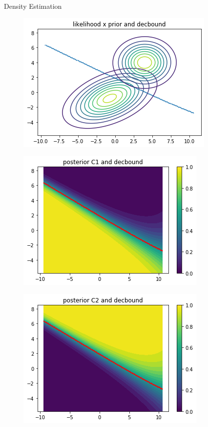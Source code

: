 \documentclass[
ngerman,
]{tudaexercise}
\begin{document}
\begin{task}{Density Estimation}
\begin{subtask}
\begin{figure}[H]
\end{figure}
\begin{figure}[H]
	\includegraphics{dec3.png}
\end{figure}
\begin{figure}[H]
	\includegraphics{dec4.png}
\end{figure}
\begin{figure}[H]
	\includegraphics{dec5.png}
\end{figure}
	\end{subtask}
	\end{task}
\end{document}
